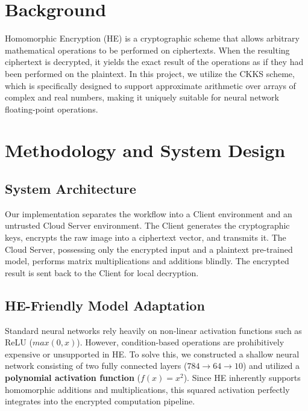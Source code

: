\documentclass[runningheads]{llncs}
\begin{document}
\section{Background}
Homomorphic Encryption (HE) is a cryptographic scheme that allows arbitrary mathematical operations to be performed on ciphertexts. When the resulting ciphertext is decrypted, it yields the exact result of the operations as if they had been performed on the plaintext. In this project, we utilize the CKKS scheme, which is specifically designed to support approximate arithmetic over arrays of complex and real numbers, making it uniquely suitable for neural network floating-point operations.

\section{Methodology and System Design}

\subsection{System Architecture}
Our implementation separates the workflow into a Client environment and an untrusted Cloud Server environment. The Client generates the cryptographic keys, encrypts the raw image into a ciphertext vector, and transmits it. The Cloud Server, possessing only the encrypted input and a plaintext pre-trained model, performs matrix multiplications and additions blindly. The encrypted result is sent back to the Client for local decryption.

\subsection{HE-Friendly Model Adaptation}
Standard neural networks rely heavily on non-linear activation functions such as ReLU ($max(0, x)$). However, condition-based operations are prohibitively expensive or unsupported in HE. To solve this, we constructed a shallow neural network consisting of two fully connected layers ($784 \to 64 \to 10$) and utilized a \textbf{polynomial activation function} ($f(x) = x^2$). Since HE inherently supports homomorphic additions and multiplications, this squared activation perfectly integrates into the encrypted computation pipeline.
\end{document}
